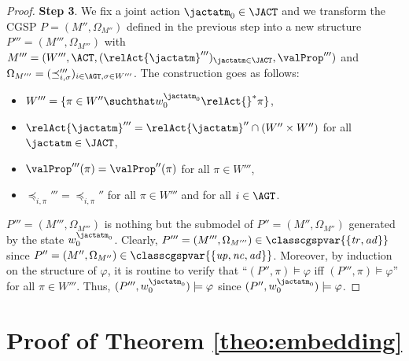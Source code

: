 \begin{proof}
\textbf{Step 3}. 
We fix a joint action 
 $\jactatm_0 \in \JACT $
 and we  transform the CGSP
  $P=(M'',\Omega_{M'' })$
  defined in the previous step 
  into a new structure 
    $P'''=(M''',\Omega_{M'''})$
    with 
     $M''' = ( W''',  \ACT,  (\relAct{\jactatm}'''  )_{\jactatm \in \JACT}, \allowbreak
  \valProp'''  )$
  and $\Omega_{M'''}=(\preceq_{i,\sigma  }'''   )_{i \in \AGT, \sigma \in W''' }$. 
  The construction goes as follows:
  \begin{itemize}
  \item $W''' = \{ \pi  \in W'' \suchthat w_0^{\jactatm_0}  \relAct{ }^* \pi  \} $,
  \item $\relAct{\jactatm}''' = \relAct{\jactatm}''
  \cap( W'' \times W'') $ for all $\jactatm \in \JACT$,
  \item $ \valProp''' (\pi  ) = \valProp'' (\pi  ) $ for all $\pi  \in W'''$,

  \item $\preceq_{i,\pi   }''' =\preceq_{i,\pi   } '' $ for all $\pi   \in W'''$
  and for all $i \in \AGT $.
  \end{itemize}
    $P'''=(M''',\Omega_{M'''})$
   is nothing but 
  the submodel of     $P''=(M'',\Omega_{M'' })$
  generated by the state $w_0^{\jactatm_0}  $. 
  Clearly, $ P'''=(M''',\Omega_{M''' })\in 
\classcgspvar{\{ \mathit{tr},\mathit{ad}  \}} $
since $P''=(M'',\Omega_{M''})
\in \classcgspvar{\{  \mathit{up} ,
\mathit{nc},\mathit{ad}  \}} $. Moreover,
by induction
on the structure of $\varphi$,
it is routine to verify
that 
``$(P'', \pi   )\models \varphi $ iff
  $(P''' ,\pi   )\models \varphi $'' for all $\pi \in W'''$. 
  Thus, $(P''' ,w_0^{\jactatm_0} )\models \varphi $ since
  $(P '',w_0^{\jactatm_0}  )\models \varphi $.
 \end{proof}


\section{Proof of Theorem \ref{theo:embedding}}
\label{annex:theoremembedding}

